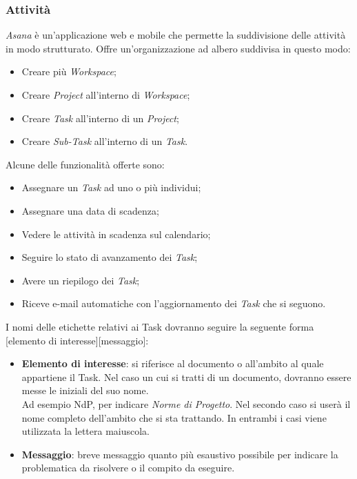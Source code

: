 \documentclass[12pt,a4paper,titlepage]{article}
\begin{document}
\subsubsection{Attività}
\textit{Asana} è un'applicazione web e mobile che permette la suddivisione delle attività in modo
strutturato. Offre un'organizzazione ad albero suddivisa in questo modo:
\begin{itemize}
	\item Creare più \textit{Workspace};
	\item Creare \textit{Project} all'interno di \textit{Workspace};
	\item Creare \textit{Task} all'interno di un \textit{Project};
	\item Creare \textit{Sub-Task} all'interno di un \textit{Task}.
\end{itemize}
Alcune delle funzionalità offerte sono:
\begin{itemize}
	\item Assegnare un \textit{Task} ad uno o più individui;
	\item Assegnare una data di scadenza;
	\item Vedere le attività in scadenza sul calendario;
	\item Seguire lo stato di avanzamento dei \textit{Task};
	\item Avere un riepilogo dei \textit{Task};
	\item Riceve e-mail automatiche con l'aggiornamento dei \textit{Task} che si seguono.
\end{itemize}
I nomi delle etichette relativi ai Task dovranno seguire la seguente forma [elemento di interesse][messaggio]:
\begin{itemize}
	\item \textbf{Elemento di interesse}: si riferisce al documento o all'ambito al quale appartiene 
	il Task. Nel caso un cui si tratti di un documento, dovranno essere messe le iniziali del suo nome.\\
	Ad esempio NdP, per indicare \textit{Norme di Progetto}. Nel secondo caso si userà il nome completo dell'ambito
	che si sta trattando. In entrambi i casi viene utilizzata la lettera maiuscola.
	\item \textbf{Messaggio}: breve messaggio quanto più esaustivo possibile per indicare la problematica da risolvere o il compito da eseguire.
\end{itemize}
\end{document}
